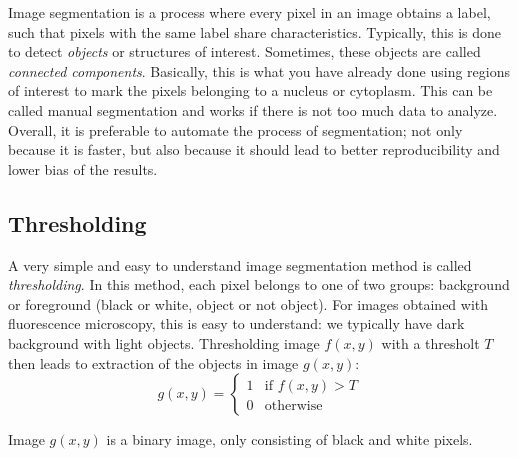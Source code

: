 Image segmentation is a process where every pixel in an image obtains a label, such that pixels with the same label share characteristics. Typically, this is done to detect \emph{objects} or structures of interest. Sometimes, these objects are called \emph{connected components}. Basically, this is what you have already done using regions of interest to mark the pixels belonging to a nucleus or cytoplasm. This can be called manual segmentation and works if there is not too much data to analyze. Overall, it is preferable to automate the process of segmentation; not only because it is faster, but also because it should lead to better reproducibility and lower bias of the results. 

\subsection{Thresholding}

A very simple and easy to understand image segmentation method is called \emph{thresholding}. In this method, each pixel belongs to one of two groups: background or foreground (black or white, object or not object). For images obtained with fluorescence microscopy, this is easy to understand: we typically have dark background with light objects. Thresholding image $f\left(x,y\right)$ with a thresholt $T$ then leads to extraction of the objects in image $g\left(x,y\right)$:
	\[
		g\left(x,y\right)=\begin{cases}
		1 &\text{if } f\left(x,y\right)>T\\
		0 &\text{otherwise}
			\end{cases}
\]

Image $g\left(x,y\right)$ is a binary image, only consisting of black and white pixels.

